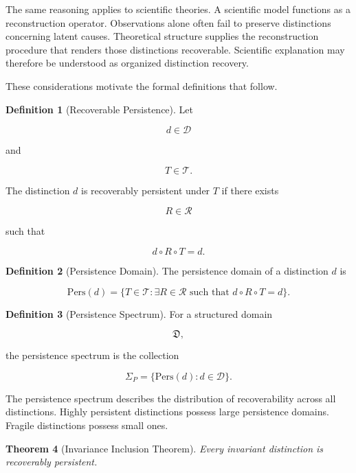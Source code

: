 \documentclass[12pt,oneside]{article}
\newtheorem{theorem}{Theorem}[section] \newtheorem{lemma}[theorem]{Lemma} \newtheorem{proposition}[theorem]{Proposition} \newtheorem{corollary}[theorem]{Corollary}
\theoremstyle{definition}
\newtheorem{definition}[theorem]{Definition} \newtheorem{axiom}[theorem]{Axiom} \newtheorem{remark}[theorem]{Remark} \newtheorem{example}[theorem]{Example}
\begin{document}
The same reasoning applies to scientific theories. A scientific model functions as a reconstruction operator. Observations alone often fail to preserve distinctions concerning latent causes. Theoretical structure supplies the reconstruction procedure that renders those distinctions recoverable. Scientific explanation may therefore be understood as organized distinction recovery.

These considerations motivate the formal definitions that follow.

\begin{definition}[Recoverable Persistence]

Let

\[
d\in\mathcal D
\]

and

\[
T\in\mathcal T.
\]

The distinction \(d\) is recoverably persistent under \(T\) if there exists

\[
R\in\mathcal R
\]

such that

\[
d\circ R\circ T
=
d.
\]

\end{definition}

\begin{definition}[Persistence Domain]

The persistence domain of a distinction \(d\) is

\[
\mathrm{Pers}(d)
=
\{
T\in\mathcal T
:
\exists R\in\mathcal R
\text{ such that }
d\circ R\circ T=d
\}.
\]

\end{definition}

\begin{definition}[Persistence Spectrum]

For a structured domain

\[
\mathfrak D,
\]

the persistence spectrum is the collection

\[
\Sigma_P
=
\{
\mathrm{Pers}(d)
:
d\in\mathcal D
\}.
\]

\end{definition}

The persistence spectrum describes the distribution of recoverability across all distinctions. Highly persistent distinctions possess large persistence domains. Fragile distinctions possess small ones.

\begin{theorem}[Invariance Inclusion Theorem]

Every invariant distinction is recoverably persistent.

\end{theorem}
\end{document}

